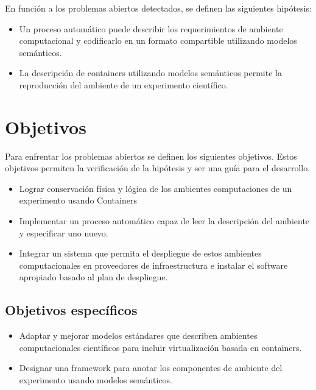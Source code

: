 En función a los problemas abiertos detectados, se definen las siguientes hipótesis:

\begin{itemize}
	\item Un proceso automático puede describir los requerimientos de ambiente computacional y codificarlo en un formato compartible utilizando modelos semánticos.
	\item La descripción de containers utilizando modelos semánticos permite la reproducción del ambiente de un experimento científico.
\end{itemize}


\section{Objetivos}

Para enfrentar los problemas abiertos se definen los siguientes objetivos. Estos objetivos permiten la verificación de la hipótesis y ser una guía para el desarrollo.


\begin{itemize}
	\item Lograr conservación física y lógica de los ambientes computaciones de un experimento usando Containers
	\item Implementar un proceso automático capaz de leer la descripción del ambiente y especificar uno nuevo.
	\item Integrar un sistema que permita el despliegue de estos ambientes computacionales en proveedores de infraestructura e instalar el software apropiado basado al plan de despliegue.
\end{itemize}

\subsection{Objetivos específicos}

\begin{itemize}
	\item Adaptar y mejorar modelos estándares que describen ambientes computacionales científicos para incluir virtualización basada en containers.
	\item Designar una framework para anotar los componentes de ambiente del experimento usando modelos semánticos.
\end{itemize}



